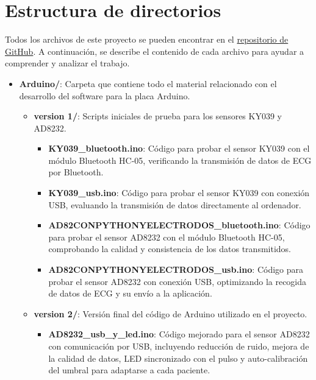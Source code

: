 
\section{Estructura de directorios}

Todos los archivos de este proyecto se pueden encontrar en el \href{https://github.com/diegotrascasa/TFG_Diego_Trascasa_Garcia}{repositorio de GitHub}. A continuación, se describe el contenido de cada archivo para ayudar a comprender y analizar el trabajo.

\begin{itemize}
    \item \textbf{Arduino/}: Carpeta que contiene todo el material relacionado con el desarrollo del software para la placa Arduino.
    \begin{itemize}
        \item \textbf{version 1/}: Scripts iniciales de prueba para los sensores KY039 y AD8232.
        \begin{itemize}
            \item \textbf{KY039\_bluetooth.ino}: Código para probar el sensor KY039 con el módulo Bluetooth HC-05, verificando la transmisión de datos de ECG por Bluetooth.
            \item \textbf{KY039\_usb.ino}: Código para probar el sensor KY039 con conexión USB, evaluando la transmisión de datos directamente al ordenador.
            \item \textbf{AD82CONPYTHONYELECTRODOS\_bluetooth.ino}: Código para probar el sensor AD8232 con el módulo Bluetooth HC-05, comprobando la calidad y consistencia de los datos transmitidos.
            \item \textbf{AD82CONPYTHONYELECTRODOS\_usb.ino}: Código para probar el sensor AD8232 con conexión USB, optimizando la recogida de datos de ECG y su envío a la aplicación.
        \end{itemize}
        \item \textbf{version 2/}: Versión final del código de Arduino utilizado en el proyecto.
        \begin{itemize}
            \item \textbf{AD8232\_usb\_y\_led.ino}: Código mejorado para el sensor AD8232 con comunicación por USB, incluyendo reducción de ruido, mejora de la calidad de datos, LED sincronizado con el pulso y auto-calibración del umbral para adaptarse a cada paciente.
        \end{itemize}
    \end{itemize}


\end{itemize}
